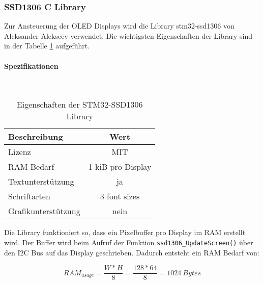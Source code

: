 \subsubsection{SSD1306 C Library}
\label{sec:Library_ssd1306}

Zur Ansteuerung der OLED Displays wird die Library stm32-ssd1306 von Aleksander Alekseev \cite{stm32-ssd1306} verwendet. Die wichtigsten Eigenschaften der Library sind in der Tabelle \ref{tab:LibSSD1306} aufgeführt.
\\
\paragraph{Spezifikationen}\vspace{-0.3cm}\\
\begin{table}[H]
	\centering
	\begin{tabular}{|l|c|}
		\hline
		\textbf{Beschreibung} & \textbf{Wert}     \\ \hline
		Lizenz                & MIT               \\ \hline
		RAM Bedarf            & 1 kiB pro Display \\ \hline
		Textunterstützung     & ja                \\ \hline
		Schriftarten          & 3 font sizes      \\ \hline
		Grafikunterstützung   & nein              \\ \hline
	\end{tabular}
	\caption{Eigenschaften der STM32-SSD1306 Library}
	\label{tab:LibSSD1306}
\end{table}

Die Library funktioniert so, dass ein Pixelbuffer pro Display im RAM erstellt wird.
Der Buffer wird beim Aufruf der Funktion \texttt{ssd1306\_UpdateScreen()} über den I2C Bus auf das Display geschrieben.
Dadurch entsteht ein RAM Bedarf von:

\begin{equation}
RAM_{usage}=\frac{W * H}{8} = \frac{128 * 64}{8} = 1024\ \si{Bytes}
\end{equation}

